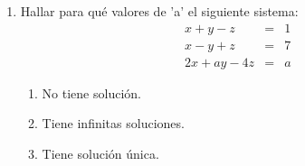 \documentclass[12pt]{article}
\begin{document}
\begin{enumerate}
    \item Hallar para qu\'e valores de 'a' el siguiente sistema:
          $$\begin{array}{rcc}
                  x+y-z    & = & 1 \\
                  x-y+z    & = & 7 \\
                  2x+ay-4z & = & a
              \end{array}$$
          \begin{enumerate}
              \item No tiene soluci\'on.
              \item Tiene infinitas soluciones.
              \item Tiene soluci\'on \'unica.
          \end{enumerate}
          
\end{enumerate}
\end{document}
